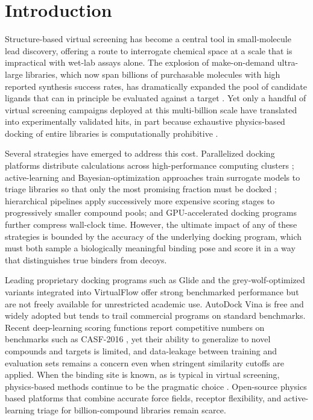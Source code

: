\section{Introduction}

Structure-based virtual screening has become a central tool in small-molecule
lead discovery, offering a route to interrogate chemical space at a scale that
is impractical with wet-lab assays alone. The explosion of make-on-demand
ultra-large libraries, which now span billions of purchasable molecules with
high reported synthesis success rates, has dramatically expanded the pool of
candidate ligands that can in principle be evaluated against a target
\citep{lyu2019ultralarge,tingle2023zinc22,irwin2005zinc}. Yet only a handful of
virtual screening campaigns deployed at this multi-billion scale have
translated into experimentally validated hits, in part because exhaustive
physics-based docking of entire libraries is computationally prohibitive
\citep{gorgulla2020virtualflow,gentile2022deepdocking}.

Several strategies have emerged to address this cost. Parallelized docking
platforms distribute calculations across high-performance computing clusters
\citep{gorgulla2020virtualflow,yaacoub2022ddgui}; active-learning and
Bayesian-optimization approaches train surrogate models to triage libraries so
that only the most promising fraction must be docked
\citep{graff2021accelerating,gentile2022deepdocking}; hierarchical pipelines
apply successively more expensive scoring stages to progressively smaller
compound pools; and GPU-accelerated docking programs further compress
wall-clock time. However, the ultimate impact of any of these strategies is
bounded by the accuracy of the underlying docking program, which must both
sample a biologically meaningful binding pose and score it in a way that
distinguishes true binders from decoys.

Leading proprietary docking programs such as Glide \citep{friesner2004glide}
and the grey-wolf-optimized variants integrated into VirtualFlow
\citep{gorgulla2020virtualflowgwo} offer strong benchmarked performance but
are not freely available for unrestricted academic use. AutoDock Vina
\citep{trott2010vina} is free and widely adopted but tends to trail
commercial programs on standard benchmarks. Recent deep-learning scoring
functions report competitive numbers on benchmarks such as CASF-2016
\citep{su2019casf2016,liu2017pdbbind,scantlebury2023pointvs}, yet their ability
to generalize to novel compounds and targets is limited, and data-leakage
between training and evaluation sets remains a concern even when stringent
similarity cutoffs are applied. When the binding site is known, as is typical
in virtual screening, physics-based methods continue to be the pragmatic
choice \citep{chaput2017usc,ebejer2019ligity,li2024cache}. Open-source physics
based platforms that combine accurate force fields, receptor flexibility, and
active-learning triage for billion-compound libraries remain scarce.

